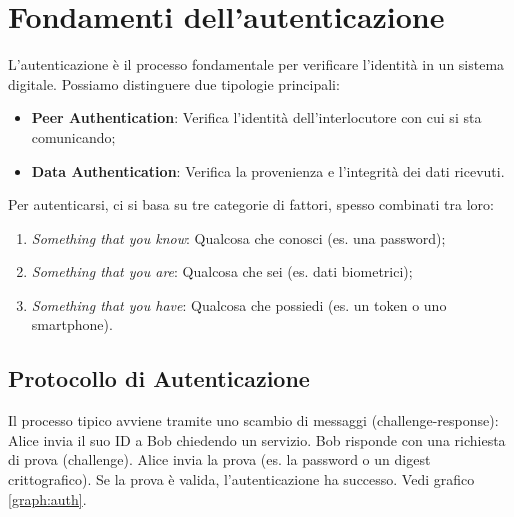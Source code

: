 %
%
\section{Fondamenti dell'autenticazione}
L'autenticazione è il processo fondamentale per verificare l'identità in un sistema digitale. Possiamo distinguere due tipologie principali:
\begin{itemize}
    \item \textbf{Peer Authentication}: Verifica l'identità dell'interlocutore con cui si sta comunicando;
    \item \textbf{Data Authentication}: Verifica la provenienza e l'integrità dei dati ricevuti.
\end{itemize}

Per autenticarsi, ci si basa su tre categorie di fattori, spesso combinati tra loro:
\begin{enumerate}
    \item \emph{Something that you know}: Qualcosa che conosci (es. una password);
    \item \emph{Something that you are}: Qualcosa che sei (es. dati biometrici);
    \item \emph{Something that you have}: Qualcosa che possiedi (es. un token o uno smartphone).
\end{enumerate}

%
\subsection{Protocollo di Autenticazione}
Il processo tipico avviene tramite uno scambio di messaggi (challenge-response): Alice invia il suo ID a Bob chiedendo un servizio. Bob risponde con una richiesta di prova (challenge). Alice invia la prova (es. la password o un digest crittografico). Se la prova è valida, l'autenticazione ha successo.
Vedi grafico \ref{graph:auth}.

